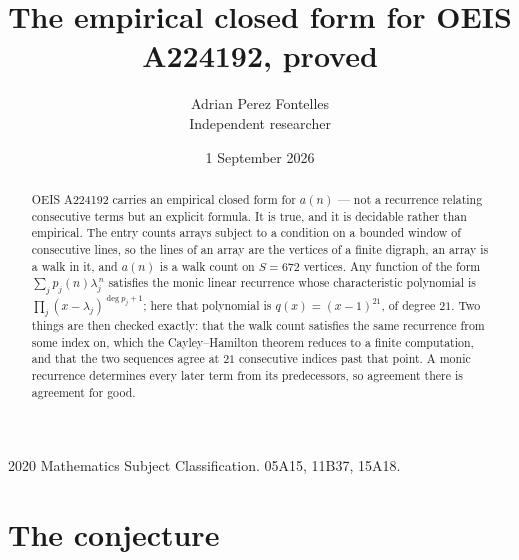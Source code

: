\documentclass[11pt,a4paper]{article}
\title{The empirical closed form for OEIS A224192, proved}
\author{Adrian Perez Fontelles\\ \small Independent researcher}
\date{1 September 2026}
\theoremstyle{plain}
\theoremstyle{definition}
\begin{document}
\maketitle

\begin{abstract}
OEIS A224192 carries an empirical closed form for $a(n)$ --- not a recurrence relating
consecutive terms but an explicit formula. It is true, and it is decidable rather than
empirical. The entry counts arrays subject to a condition on a bounded window of consecutive lines, so the lines of an array are the
vertices of a finite digraph, an array is a walk in it, and $a(n)$ is a walk count on
$S=672$ vertices. Any function of the form $\sum_j p_j(n)\lambda_j^{\,n}$ satisfies the
monic linear recurrence whose characteristic polynomial is
$\prod_j(x-\lambda_j)^{\deg p_j+1}$; here that polynomial is $q(x)=(x-1)^{21}$, of degree
$21$. Two things are then checked exactly: that the walk count satisfies the same
recurrence from some index on, which the Cayley--Hamilton theorem reduces to a finite
computation, and that the two sequences agree at $21$ consecutive indices past that
point. A monic recurrence determines every later term from its predecessors, so agreement
there is agreement for good.
\end{abstract}

\noindent\small 2020 Mathematics Subject Classification. 05A15, 11B37, 15A18.\normalsize

\section{The conjecture}
\end{document}
